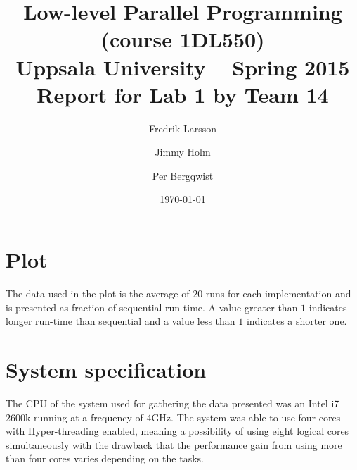 \documentclass[a4paper,11pt]{article}
\title{\textbf{Low-level Parallel Programming (course 1DL550) \\
    Uppsala University -- Spring 2015 \\
    Report for Lab 1 by Team 14}}
\author{Fredrik Larsson \and Jimmy Holm \and Per Bergqwist}
\date{\today}
\begin{document}
\maketitle
\section{Plot}
\begin{center}
\end{center}
The data used in the plot is the average of 20 runs for each
implementation and is presented as fraction of sequential run-time. A value greater than $1$ indicates
longer run-time than sequential and a value less than $1$ indicates a shorter one.
\section{System specification}
The CPU of the system used for gathering the data presented was an Intel i7 2600k
running at a frequency of 4GHz. The system was able to use four cores
with Hyper-threading enabled, meaning a possibility of using eight logical
cores simultaneously with the drawback that the performance gain from
using more than four cores varies depending on the tasks.
\end{document}
